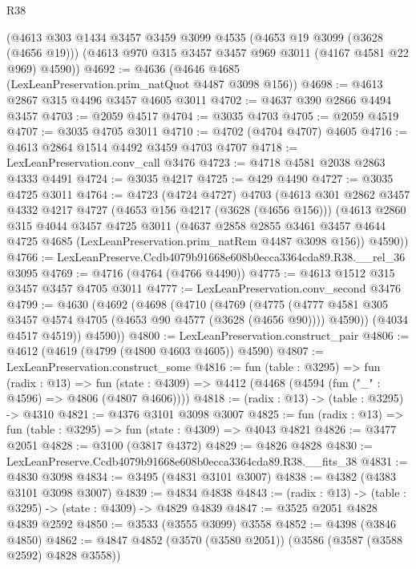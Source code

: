 \begin{lexlean}{R38}
\begin{coremodule}
    (@4613
      @303
      @1434
      @3457
      @3459
      @3099
      @4535
      (@4653 @19 @3099 (@3628 (@4656 @19)))
      (@4613 @970 @315 @3457 @3457 @969 @3011 (@4167 @4581 @22 @969) @4590))
@4692 := @4636 (@4646 @4685 (LexLeanPreservation.prim_natQuot @4487 @3098 @156))
@4698 := @4613 @2867 @315 @4496 @3457 @4605 @3011
@4702 := @4637 @390 @2866 @4494 @3457
@4703 := @2059 @4517
@4704 := @3035 @4703
@4705 := @2059 @4519
@4707 := @3035 @4705 @3011
@4710 := @4702 (@4704 @4707) @4605
@4716 := @4613 @2864 @1514 @4492 @3459 @4703 @4707
@4718 := LexLeanPreservation.conv_call @3476
@4723 := @4718 @4581 @2038 @2863 @4333 @4491
@4724 := @3035 @4217
@4725 := @429 @4490
@4727 := @3035 @4725 @3011
@4764 := @4723
    (@4724 @4727)
    @4703
    (@4613
      @301
      @2862
      @3457
      @4332
      @4217
      @4727
      (@4653 @156 @4217 (@3628 (@4656 @156)))
      (@4613
        @2860
        @315
        @4044
        @3457
        @4725
        @3011
        (@4637
          @2858
          @2855
          @3461
          @3457
          @4644
          @4725
          @4685
          (LexLeanPreservation.prim_natRem @4487 @3098 @156))
        @4590))
@4766 := LexLeanPreserve.Ccdb4079b91668e608b0ecca3364cda89.R38.__rel_36 @3095
@4769 := @4716 (@4764 (@4766 @4490))
@4775 := @4613 @1512 @315 @3457 @3457 @4705 @3011
@4777 := LexLeanPreservation.conv_second @3476
@4799 := @4630
    (@4692
      (@4698
        (@4710
          (@4769
            (@4775
              (@4777 @4581 @305 @3457 @4574 @4705 (@4653 @90 @4577 (@3628 (@4656 @90))))
              @4590))
          (@4034 @4517 @4519))
        @4590))
@4800 := LexLeanPreservation.construct_pair
@4806 := @4612 (@4619 (@4799 (@4800 @4603 @4605)) @4590)
@4807 := LexLeanPreservation.construct_some
@4816 := fun (table : @3295) =>
  fun (radix : @13) =>
  fun (state : @4309) => @4412 (@4468 (@4594 (fun ("_" : @4596) => @4806 (@4807 @4606))))
@4818 := (radix : @13) -> (table : @3295) -> @4310
@4821 := @4376 @3101 @3098 @3007
@4825 := fun (radix : @13) => fun (table : @3295) => fun (state : @4309) => @4043 @4821
@4826 := @3477 @2051
@4828 := @3100 (@3817 @4372)
@4829 := @4826 @4828
@4830 := LexLeanPreserve.Ccdb4079b91668e608b0ecca3364cda89.R38.__fits_38
@4831 := @4830 @3098
@4834 := @3495 (@4831 @3101 @3007)
@4838 := @4382 (@4383 @3101 @3098 @3007)
@4839 := @4834 @4838
@4843 := (radix : @13) -> (table : @3295) -> (state : @4309) -> @4829 @4839
@4847 := @3525 @2051 @4828 @4839 @2592
@4850 := @3533 (@3555 @3099) @3558
@4852 := @4398 (@3846 @4850)
@4862 := @4847 @4852 (@3570 (@3580 @2051)) (@3586 (@3587 (@3588 @2592) @4828 @3558))

\end{coremodule}
\end{lexlean}
